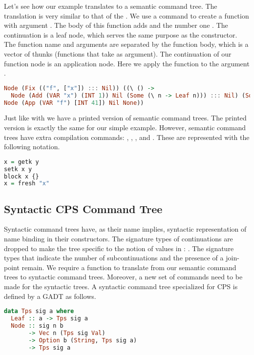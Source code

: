 Let's see how our example  translates to a semantic command tree. The translation is very similar to that of the . We use a  command to create a function  with argument . The body of this function adds  and the number one . The continuation is a leaf node, which serves the same purpose as the  constructor. The function name and arguments are separated by the function body, which is a vector of thunks (functions that take \icode{()} as argument). The continuation of our function node is an application node. Here we apply the function  to the argument .
  
\begin{lstlisting}[language=Haskell]
Node (Fix (("f", ["x"]) ::: Nil)) ((\ () ->
  Node (Add (VAR "x") (INT 1)) Nil (Some (\ n -> Leaf n))) ::: Nil) (Some (\ () ->
Node (App (VAR "f") [INT 41]) Nil None))
\end{lstlisting}

Just like with  we have a printed version of semantic command trees. The printed version is exactly the same for our simple example. However, semantic command trees have extra compilation commands: , , , and . These are represented with the following notation.

\begin{lstlisting}[language=Haskell]
x = getk y
setk x y
block x {}
x = fresh "x"
\end{lstlisting}

\subsection{\label{subsection:syntree}Syntactic CPS Command Tree}
Syntactic command trees have, as their name implies, syntactic representation of name binding in their constructors. The signature types of continuations are dropped to make the tree specific to the notion of values in : . The signature types that indicate the number of subcontinuations and the presence of a join-point remain. We require a function to translate from our semantic command trees to syntactic command trees. Moreover, a new set of commands need to be made for the syntactic trees. A syntactic command tree specialized for CPS  is defined by a GADT as follows.

\begin{lstlisting}[language=Haskell]
data Tps sig a where
  Leaf :: a -> Tps sig a
  Node :: sig n b
       -> Vec n (Tps sig Val)
       -> Option b (String, Tps sig a)
       -> Tps sig a
\end{lstlisting}

